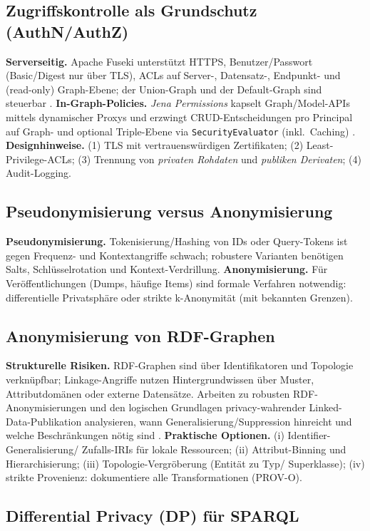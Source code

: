 \subsection{Zugriffskontrolle als Grundschutz (AuthN/AuthZ)}
\textbf{Serverseitig.} Apache Fuseki unterstützt HTTPS, Benutzer/Passwort (Basic/Digest nur über TLS), ACLs auf Server-, Datensatz-, Endpunkt- und (read-only) Graph-Ebene; der Union-Graph und der Default-Graph sind steuerbar \cite{FusekiAccess}. \textbf{In-Graph-Policies.} \emph{Jena Permissions} kapselt Graph/Model-APIs mittels dynamischer Proxys und erzwingt CRUD-Entscheidungen pro Principal auf Graph- und optional Triple-Ebene via \texttt{SecurityEvaluator} (inkl.\ Caching) \cite{JenaPermissions}. 
\textbf{Designhinweise.} (1) TLS mit vertrauenswürdigen Zertifikaten; (2) Least-Privilege-ACLs; (3) Trennung von \emph{privaten Rohdaten} und \emph{publiken Derivaten}; (4) Audit-Logging.

\subsection{Pseudonymisierung versus Anonymisierung}
\textbf{Pseudonymisierung.} Tokenisierung/Hashing von IDs oder Query-Tokens ist gegen Frequenz- und Kontextangriffe schwach; robustere Varianten benötigen Salts, Schlüsselrotation und Kontext-Verdrillung. \textbf{Anonymisierung.} Für Veröffentlichungen (Dumps, häufige Items) sind formale Verfahren notwendig: differentielle Privatsphäre oder strikte k-Anonymität (mit bekannten Grenzen).

\subsection{Anonymisierung von RDF-Graphen}
\textbf{Strukturelle Risiken.} RDF-Graphen sind über Identifikatoren und Topologie verknüpfbar; Linkage-Angriffe nutzen Hintergrundwissen über Muster, Attributdomänen oder externe Datensätze. Arbeiten zu robusten RDF-Anonymisierungen und den logischen Grundlagen privacy-wahrender Linked-Data-Publikation analysieren, wann Generalisierung/Suppression hinreicht und welche Beschränkungen nötig sind \cite{DelanauxRDFAnon, CuencaKostylevFoundations}. 
\textbf{Praktische Optionen.} (i) Identifier-Generalisierung/ Zufalls-IRIs für lokale Ressourcen; (ii) Attribut-Binning und Hierarchisierung; (iii) Topologie-Vergröberung (Entität zu Typ/ Superklasse); (iv) strikte Provenienz: dokumentiere alle Transformationen (PROV-O).

\subsection{Differential Privacy (DP) für SPARQL}
